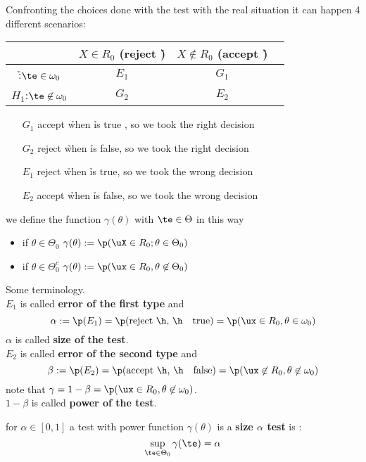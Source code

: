 Confronting the choices done with the test with the real situation it can happen 4 different scenarios:
\begin{center}
	\begin{tabular}{ | c | c | c | c | }
		\hline
		                              & $X\in R_0$ (reject \h)     & $X\not \in R_0$ (accept \h)  \\ \hline
		\h:$\te \in \omega_0$         & $E_1$          & $G_1$            \\ \hline
		$H_1$:$\te \not \in \omega_0$ & $G_2$          & $E_2$            \\
		\hline
	\end{tabular}
\end{center}
	\begin{itemize}
		\item[$G_1$] accept \h when \h is true , so we took the right decision 
		\item[$G_2$] reject \h when \h is false, so we took the right decision
		\item[$E_1$] reject \h when \h is true, so we took the wrong decision
		\item[$E_2$] accept \h when \h is false, so we took the wrong decision
	\end{itemize}
\begin{defi}
	we define the function $\gamma(\theta) $ with $\te \in \Theta$ in this way
	\begin{itemize}
		\item if $\theta \in \Theta_0$   $\gamma(\theta):=\p(\uX \in R_0 ; \theta \in \Theta_0)$
		\item if $\theta\in \Theta_0^c$    $\gamma(\theta):= \p(\ux \in R_0, \theta \not \in \Theta_0)$
	\end{itemize}
\end{defi}
\begin{defi}Some terminology.\\
	$E_1$ is called \textbf{error of the first type} and  $$\alpha:=\p(E_1)=\p(\text{reject \h, \h \ \ true})=\p(\ux \in R_0 , \theta \in \omega_0)$$ $\alpha$ is called \textbf{size of the test}.\\
	$E_2$ is called \textbf{error of the second type} and $$\beta:=\p(E_2)=\p(\text{accept \h, \h \ \ false})=\p(\ux \not \in R_0 , \theta \not \in \omega_0)$$
	note that $\gamma=1-\beta=\p(\ux \in R_0, \theta \not \in \omega_0)$.\\$1-\beta$ is called \textbf{power of the test}.
\end{defi}
\begin{defi}for $\alpha\in [0,1]$ a test with power function $\gamma (\theta)$ is a \textbf{size $\alpha$ test} is :
	$$\sup_{\te \in \Theta_0}\gamma (\te)=\alpha$$
\end{defi}
